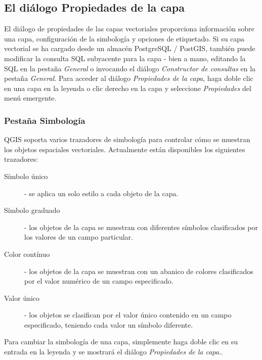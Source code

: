 \subsection{El diálogo Propiedades de la capa}\label{sec:vectorprops}

El diálogo de propiedades de las capas vectoriales proporciona información sobre una capa, configuración de la simbología y opciones de etiquetado. Si su capa vectorial se ha cargado desde un almacén PostgreSQL / PostGIS, también puede modificar la consulta SQL subyacente para la capa - bien a mano, editando la SQL en la pestaña \textit{General} o invocando el diálogo \textit{Constructor de consultas} en la pestaña \textit{General}. Para acceder al diálogo \textit{Propiedades de la capa}, haga doble clic en una capa en la leyenda o clic derecho en la capa y seleccione \textit{Propiedades} del menú emergente.

\subsubsection{Pestaña Simbología}\label{sec:symbology}

QGIS soporta varios trazadores de simbología para controlar cómo se muestran los objetos espaciales vectoriales. Actualmente están disponibles los siguientes trazadores:

\begin{description}
    \item[Símbolo único] - se aplica un solo estilo a cada objeto de la capa.
    \item[Símbolo graduado] - los objetos de la capa se muestran con diferentes símbolos clasificados por los valores de un campo particular.
    \item[Color contínuo] - los objetos de la capa se muestran con un abanico de colores clasificados por el valor numérico de un campo especificado.
    \item[Valor único] - los objetos se clasifican por el valor único contenido en un campo especificado, teniendo cada valor un símbolo diferente.
\end{description}

Para cambiar la simbología de una capa, simplemente haga doble clic en su entrada en la leyenda y se mostrará el diálogo \textit{Propiedades de la capa}..

